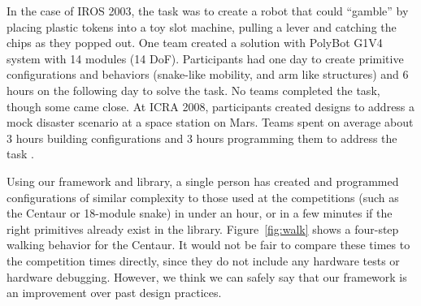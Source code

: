 \documentclass[graybox]{svmult}
\begin{document}
In the case of IROS 2003, the task was to create a robot that could ``gamble'' by placing plastic tokens into a toy slot machine, pulling a lever and catching the chips as they popped out.  One team created a solution with PolyBot G1V4 system with 14 modules (14 DoF). Participants
had one day to create primitive configurations and behaviors (snake-like mobility, and arm like structures) and
 6 hours on the following day to solve the task. No teams completed the task, though
some came close. 
At ICRA 2008, participants created designs to address a mock disaster scenario
at a space station on Mars. Teams spent on average about 3 hours building configurations and
3 hours programming them to address the task \cite{sastra2011using}.  
  
Using our framework and library, a single person has created and programmed   configurations of similar complexity to those used at
the competitions (such as the Centaur or 18-module snake)
in under an hour,
or in a few minutes if the right primitives already exist in the library. Figure~\ref{fig:walk} shows a four-step walking behavior for the Centaur. It would
not be fair to compare these times to the competition times directly, since they do not include any
hardware tests or hardware debugging. However, we think we can safely say that
our framework is an improvement over past design practices.
%
\end{document}

